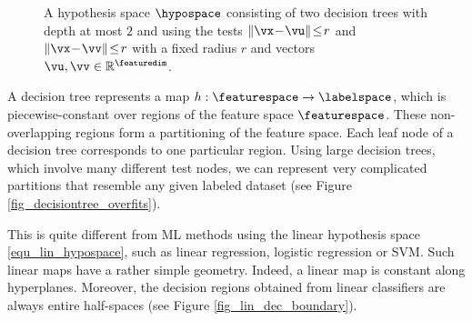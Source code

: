 \documentclass[12pt]{report}
\newcommand{\featurelen}{\featuredim}
\begin{document}
\begin{figure}[htbp]
\begin{center}
\begin{minipage}{.4\textwidth}
\end{minipage}
\hspace*{3mm}
\begin{minipage}{.4\textwidth}
      \end{minipage}
 \end{center}
 \caption{A hypothesis space $\hypospace$ consisting of two decision trees 
 	with depth at most $2$ and using the tests $\| \vx\!-\!\vu \|\!\leq\!r$ and $\|\vx\!-\!\vv \|\!\leq\!r$ 
 	with a fixed radius $r$ and vectors $\vu,\vv \in \mathbb{R}^{\featurelen}$. }
 \label{fig_hypospace_DT_depth_2}
\end{figure}

A decision tree represents a map $h: \featurespace \rightarrow \labelspace$, which 
is piecewise-constant over regions of the feature space $\featurespace$. These 
non-overlapping regions form a partitioning of the feature space. Each leaf node of 
a decision tree corresponds to one particular region. Using large decision trees, which 
involve many different test nodes, we can represent very complicated partitions 
that resemble any given labeled dataset (see Figure \ref{fig_decisiontree_overfits}). 

This is quite different from ML methods using the linear hypothesis space \eqref{equ_lin_hypospace}, 
such as linear regression, logistic regression or SVM. Such linear maps have a rather 
simple geometry. Indeed, a linear map is constant along hyperplanes. Moreover, the 
decision regions obtained from linear classifiers are always entire half-spaces (see Figure \ref{fig_lin_dec_boundary}). 
\end{document}
